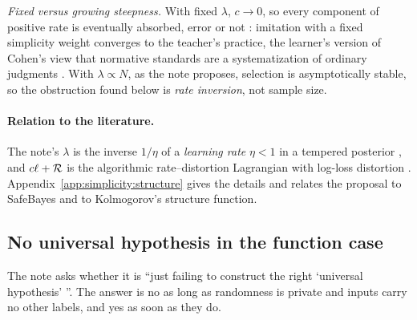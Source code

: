 \emph{Fixed versus growing steepness.} With fixed $\lambda$, $c\to0$, so every component of positive rate is eventually absorbed, error or not : imitation with a fixed simplicity weight converges to the teacher's practice, the learner's version of Cohen's view that normative standards are a systematization of ordinary judgments \citep{cohen1981can}. With $\lambda\propto N$, as the note proposes, selection is asymptotically stable, so the obstruction found below is \emph{rate inversion}, not sample size.

\paragraph{Relation to the literature.} The note's $\lambda$ is the inverse $1/\eta$ of a \emph{learning rate} $\eta<1$ in a tempered posterior \citep{grunwald2012safe,grunwald2017inconsistency,zhang2006epsilon,bissiri2016general,bhattacharya2019fractional}, and $c\ell+\mathcal R$ is the algorithmic rate--distortion Lagrangian with log-loss distortion \citep{vereshchagin2010rate}. Appendix~\ref{app:simplicity:structure} gives the details and relates the proposal to SafeBayes and to Kolmogorov's structure function.

\subsection{No universal hypothesis in the function case}\label{sec:simplicity:universal}

The note asks whether it is ``just failing to construct the right `universal hypothesis' ''. The answer is no as long as randomness is private and inputs carry no other labels, and yes as soon as they do.

